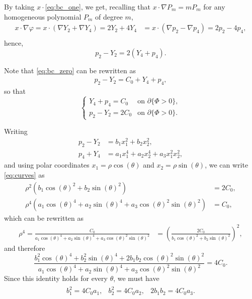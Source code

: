 \documentclass[10pt,a4paper]{article}
\numberwithin{equation}{section}
\begin{document}
By taking $x\cdot$\eqref{eq:bc_one}, we get, recalling that $ x\cdot \nabla P_m = mP_m$ for any homogeneous polynomial $P_m$ of degree $m$,
\begin{align*}
	x\cdot \nabla \varphi =x\cdot( \nabla Y_2 + \nabla Y_4 ) = 2Y_2 + 4Y_4 &= x\cdot( \nabla p_2 - \nabla p_4) = 2 p_2 - 4 p_4, \\
\end{align*}
hence,
\[
	 p_2 - Y_2 = 2 (Y_4 + p_4).
\]

Note that \eqref{eq:bc_zero} can be rewritten as
\begin{align*}
p_2- Y_2 = C_0 + Y_4 + p_4,
\end{align*}
so that 
\begin{equation}
	\label{eq:curves}
\begin{cases}
	Y_4 + p_4 = C_0 & \text{on } \partial\{\Phi>0\},\\
	p_2 - Y_2 = 2 C_0  & \text{on } \partial\{\Phi>0\}.
\end{cases}
\end{equation}

Writing 
\begin{align*}
	p_2 - Y_2 &= b_1 x_1^2 + b_2 x_2^2, \\
	p_4 + Y_4 &= a_1 x_1^4 + a_2 x_2^4 + a_3 x_1^2x_2^2,
\end{align*}
and using polar coordinates $x_1 = \rho \cos(\theta)$ and $x_2 = \rho \sin(\theta)$, we can write \eqref{eq:curves} as 
\begin{align*}
	\rho^2 (b_1 \cos(\theta)^2 + b_2 \sin(\theta)^2) &= 2C_0, \\
	\rho^4 (a_1 \cos(\theta)^4 + a_2 \sin(\theta)^4 + a_3 \cos(\theta)^2 \sin(\theta)^2) &= C_0,
\end{align*}
which can be rewritten as
\begin{align*}
	\rho^4 = \frac{C_0}{a_1 \cos(\theta)^4 + a_2 \sin(\theta)^4 + a_3 \cos(\theta)^2 \sin(\theta)^2} &= \left( \frac{2C_0}{b_1 \cos(\theta)^2 + b_2 \sin(\theta)^2} \right)^2,
\end{align*}
and therefore
\[
	 \frac{b_1^2 \cos(\theta)^4 + b_2^2 \sin(\theta)^4 + 2b_1b_2 \cos(\theta)^2 \sin(\theta)^2}{a_1 \cos(\theta)^4 + a_2 \sin(\theta)^4 + a_3 \cos(\theta)^2 \sin(\theta)^2} = 4C_0.
\]
Since this identity holds for every $ \theta $, we must have
\begin{align*}
	\begin{array}{ccc}
		b_1^2 = 4C_0a_1, &
		b_2^2 = 4C_0a_2, &
	2b_1b_2 = 4C_0a_3.
	\end{array}
\end{align*}
\end{document}
